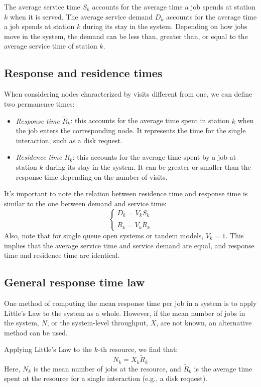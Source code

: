 The average service time $S_k$ accounts for the average time a job spends at station $k$ when it is served.
The average service demand $D_k$ accounts for the average time a job spends at station $k$ during its stay in the system. 
Depending on how jobs move in the system, the demand can be less than, greater than, or equal to the average service time of station $k$. 

\subsection{Response and residence times}
When considering nodes characterized by visits different from one, we can define two permanence times:
\begin{itemize}
    \item \textit{Response time $\tilde{R}_k$}: this accounts for the average time spent in station $k$ when the job enters the corresponding node. 
        It represents the time for the single interaction, such as a disk request.
    \item \textit{Residence time $R_k$}: this accounts for the average time spent by a job at station $k$ during its stay in the system. 
        It can be greater or smaller than the response time depending on the number of visits.
\end{itemize}
It's important to note the relation between residence time and response time is similar to the one between demand and service time:
\[\begin{cases}
    D_k=V_kS_k \\
    R_k=V_k\tilde{R}_k
\end{cases}\]
Also, note that for single queue open systems or tandem models, $V_k=1$. 
This implies that the average service time and service demand are equal, and response time and residence time are identical.

\subsection{General response time law}
One method of computing the mean response time per job in a system is to apply Little's Law to the system as a whole. 
However, if the mean number of jobs in the system, $N$, or the system-level throughput, $X$, are not known, an alternative method can be used.

Applying Little's Law to the $k$-th resource, we find that: 
\[N_k=X_k\tilde{R}_k\]
Here, $N_k$ is the mean number of jobs at the resource, and $\tilde{R}_k$ is the average time spent at the resource for a single interaction (e.g., a disk request).

